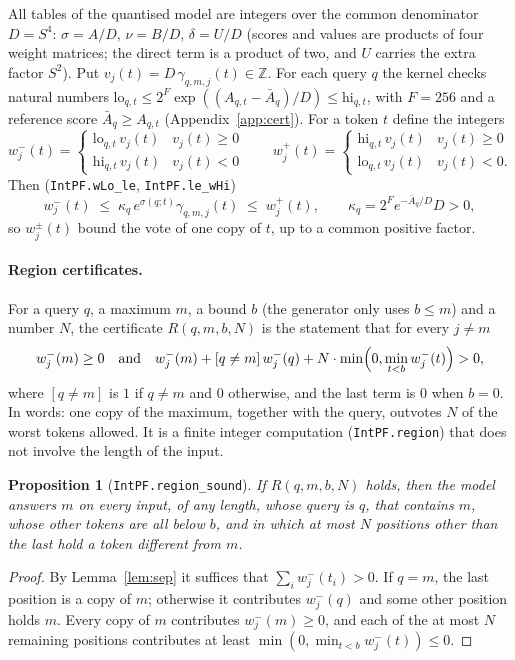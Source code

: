 \documentclass[11pt,a4paper]{article}
\newtheorem{proposition}[theorem]{Proposition}
\newcommand{\lean}[1]{\texttt{#1}}
\begin{document}
All tables of the quantised model are integers over the common denominator
$D=S^4$: $\sigma=A/D$, $\nu=B/D$, $\delta=U/D$ (scores and values are products
of four weight matrices; the direct term is a product of two, and $U$ carries
the extra factor $S^2$). Put
$v_j(t)=D\,\gamma_{q,m,j}(t)\in\mathbb Z$. For each query $q$ the kernel checks
natural numbers $\mathrm{lo}_{q,t}\le 2^{F}\exp((A_{q,t}-\bar A_q)/D)\le
\mathrm{hi}_{q,t}$, with $F=256$ and a reference score $\bar A_q\ge A_{q,t}$
(Appendix~\ref{app:cert}). For a token $t$ define the integers
\[
 w^-_j(t)=\begin{cases}\mathrm{lo}_{q,t}\,v_j(t)&v_j(t)\ge0\\ \mathrm{hi}_{q,t}\,v_j(t)&v_j(t)<0\end{cases}
 \qquad
 w^+_j(t)=\begin{cases}\mathrm{hi}_{q,t}\,v_j(t)&v_j(t)\ge0\\ \mathrm{lo}_{q,t}\,v_j(t)&v_j(t)<0.\end{cases}
\]
Then (\lean{IntPF.wLo\_le}, \lean{IntPF.le\_wHi})
\[
 w^-_j(t)\;\le\; \kappa_q\,e^{\sigma(q;t)}\gamma_{q,m,j}(t)\;\le\; w^+_j(t),
 \qquad \kappa_q=2^Fe^{-\bar A_q/D}D>0 ,
\]
so $w^\pm_j(t)$ bound the vote of one copy of $t$, up to a common positive
factor.

\paragraph{Region certificates.}
For a query $q$, a maximum $m$, a bound $b$ (the generator only uses $b\le m$)
and a number $N$, the certificate $R(q,m,b,N)$ is the statement that for every
$j\ne m$
\[
 w^-_j(m)\ge 0\quad\text{and}\quad
 w^-_j(m)+[q\ne m]\,w^-_j(q)+N\cdot\min\Bigl(0,\min_{t<b}w^-_j(t)\Bigr)>0 ,
\]
where $[q\ne m]$ is $1$ if $q\ne m$ and $0$ otherwise, and the last term is $0$
when $b=0$. In words: one copy of the
maximum, together with the query, outvotes $N$ of the worst tokens allowed. It
is a finite integer computation (\lean{IntPF.region}) that does not involve the
length of the input.

\begin{proposition}[\lean{IntPF.region\_sound}]\label{prop:region}
If $R(q,m,b,N)$ holds, then the model answers $m$ on every input, of any
length, whose query is $q$, that contains $m$, whose other tokens are all below
$b$, and in which at most $N$ positions other than the last hold a token
different from $m$.
\end{proposition}
\begin{proof}
By Lemma~\ref{lem:sep} it suffices that $\sum_i w^-_j(t_i)>0$. If $q=m$, the
last position is a copy of $m$; otherwise it contributes $w^-_j(q)$ and some
other position holds $m$. Every copy of $m$ contributes $w^-_j(m)\ge0$, and each
of the at most $N$ remaining positions contributes at least
$\min(0,\min_{t<b}w^-_j(t))\le 0$.
\end{proof}
\end{document}
